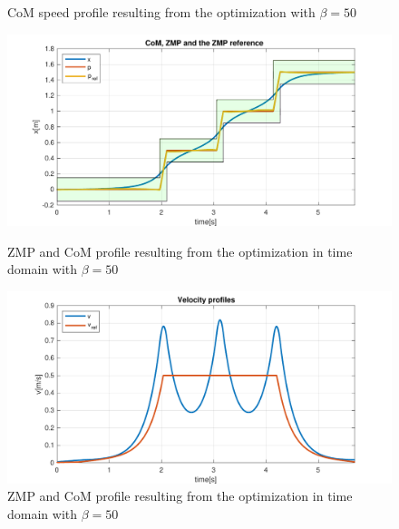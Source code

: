 \documentclass[a4paper]{article}
\begin{document}
\begin{figure}
\begin{minipage}[b]{0.48\textwidth}
        \caption{CoM speed profile resulting from the optimization with $\beta=50$} 
        \label{fig:opt_vx_50_space}
     \end{minipage}   
     \vfill
       \begin{minipage}[b]{0.48\textwidth}
         \centering
        \includegraphics[scale=0.4]{plot/SQD/50/x_time_50.pdf}
        \caption{ZMP and CoM profile resulting from the optimization in time domain with $\beta=50$} 
        \label{fig:opt_x_50_time}
     \end{minipage}  
     \hfill
     \begin{minipage}[b]{0.48\textwidth}
         \centering
        \includegraphics[scale=0.4]{plot/SQD/50/vx_time_50.pdf} 
        \caption{ZMP and CoM profile resulting from the optimization in time domain with $\beta=50$} 
        \label{fig:opt_vx_50_time}
     \end{minipage}     
    
\end{figure}
\end{document}
